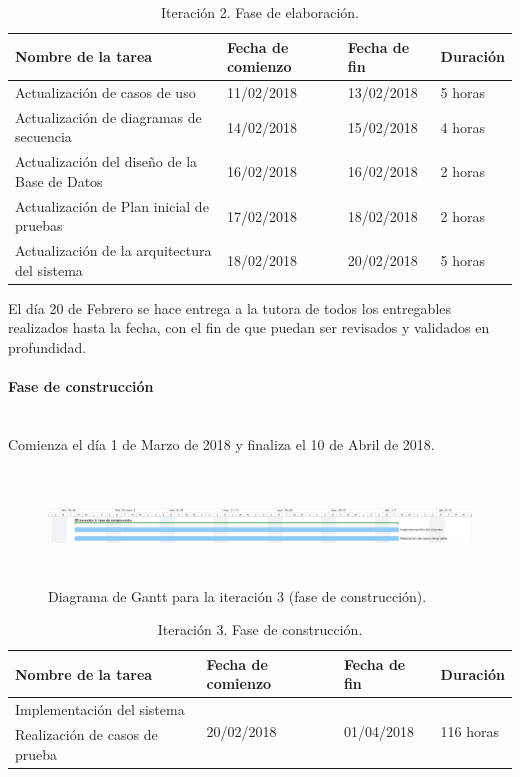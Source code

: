 \documentclass[twoside]{report}
\begin{document}
\begin{table}[H]
\centering
\begin{tabular}{|l|l|l|l|}
\hline
Nombre de la tarea                           & Fecha de comienzo & Fecha de fin & Duración \\ \hline
Actualización de casos de uso                & 11/02/2018        & 13/02/2018   & 5 horas   \\ \hline
Actualización de diagramas de secuencia      & 14/02/2018        & 15/02/2018   & 4 horas   \\ \hline
Actualización del diseño de la Base de Datos & 16/02/2018        & 16/02/2018   & 2 horas   \\ \hline
Actualización de Plan inicial de pruebas     & 17/02/2018        & 18/02/2018   & 2 horas   \\ \hline
Actualización de la arquitectura del sistema & 18/02/2018        & 20/02/2018   & 5 horas   \\ \hline
\end{tabular}
\caption{Iteración 2. Fase de elaboración.}
\end{table}

El día 20 de Febrero se hace entrega a la tutora de todos los entregables realizados hasta la fecha, con el fin de que puedan ser revisados y validados en profundidad.


\paragraph{Fase de construcción}\mbox{}\\

Comienza el día 1 de Marzo de 2018 y finaliza el 10 de Abril de 2018.

\begin{figure}[H]
\begin{center}
\includegraphics[height=3cm,width=\textwidth]{images/gantt/ite3}
\caption{Diagrama de Gantt para la iteración 3 (fase de construcción).}
\end{center}
\end{figure}


\begin{table}[H]
\centering
\begin{tabular}{|l|l|l|l|}
\hline
Nombre de la tarea             & Fecha de comienzo & Fecha de fin & Duración \\ \hline
Implementación del sistema & \multirow{2}{*}{20/02/2018}  & \multirow{2}{*}{01/04/2018}   & \multirow{2}{*}{116 horas}  \\
Realización de casos de prueba & & & \\
\hline
\end{tabular}
\caption{Iteración 3. Fase de construcción.}
\end{table}
\end{document}
